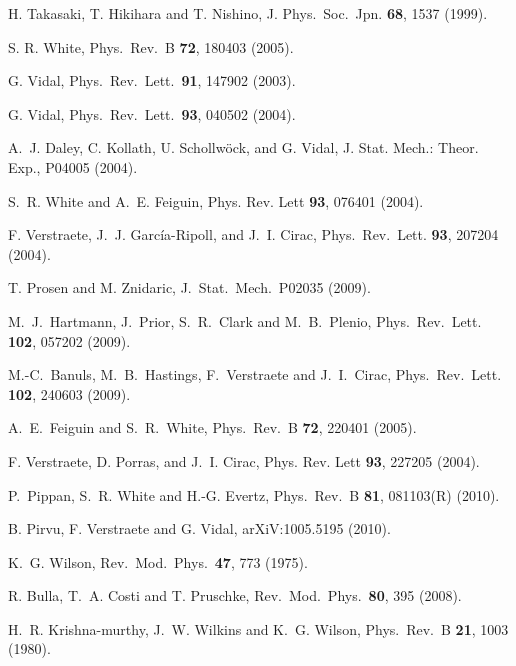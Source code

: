 H. Takasaki, T. Hikihara and T. Nishino, J. Phys.\ Soc.\ Jpn. {\bf 68}, 1537 (1999).

S. R. White, Phys.\ Rev.\ B {\bf 72}, 180403 (2005).

G. Vidal, Phys.\ Rev.\ Lett.\ {\bf 91}, 147902 (2003).

G. Vidal, Phys.\ Rev.\ Lett.\ {\bf 93}, 040502  (2004).

A.~J. Daley, C. Kollath, U. Schollw{\"o}ck, and G. Vidal, J. Stat. Mech.: 
Theor. Exp.,  P04005  (2004).

S.~R. White and A.~E. Feiguin, Phys. Rev. Lett {\bf 93},  076401  (2004).

F. Verstraete, J.~J. Garc{\'i}a-Ripoll, and J.~I. Cirac, Phys.\ Rev.\ Lett. {\bf
  93},  207204  (2004).

T. Prosen and M. Znidaric, J.\ Stat.\ Mech.\ P02035 (2009).

M.~J.~Hartmann, J.~Prior, S.~R.~Clark and M.~B.~Plenio, 
Phys.\ Rev.\ Lett. {\bf 102}, 057202 (2009).

M.-C.~Banuls, M.~B.~Hastings, F.~Verstraete and J.~I.~Cirac, 
Phys.\ Rev.\ Lett. {\bf 102}, 240603 (2009).

A.~E.~Feiguin and S.~R.~White, 
Phys.\ Rev.\ B {\bf 72}, 220401 (2005).

F. Verstraete, D. Porras, and J.~I. Cirac, Phys. Rev. Lett {\bf 93},  227205
  (2004).

P.~Pippan, S.~R. White and H.-G. Evertz, Phys.\ Rev.\ B {\bf 81}, 081103(R) (2010).

 B. Pirvu, F. Verstraete and G. Vidal, arXiV:1005.5195 (2010).

K.~G. Wilson, Rev.\ Mod.\ Phys.\ {\bf 47}, 773 (1975).

R. Bulla, T.~A. Costi and T. Pruschke, Rev.\ Mod.\ Phys.\ {\bf 80}, 395 (2008).

H.~R. Krishna-murthy, J.~W. Wilkins and K.~G. Wilson, Phys.\ Rev.\ B {\bf 21}, 1003 (1980).


